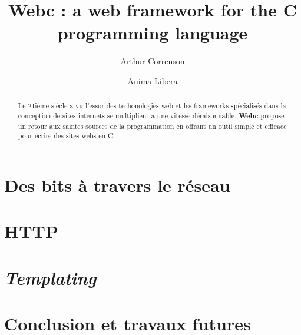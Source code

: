 \documentclass[french, twocolumn]{article}
\begin{document}
    \title{Webc : a web framework for the C programming language}
    \author{Arthur Correnson \and Anima Libera}
    \maketitle
    \begin{abstract}
        Le 21ième siècle a vu l'essor des techonologies web et les frameworks spécialisés dans la conception de sites internets se multiplient a une vitesse déraisonnable. \textbf{Webc} propose un retour aux saintes sources de la programmation en offrant un outil simple et efficace pour écrire des sites webs en C.
    \end{abstract}
    \section{Des bits à travers le réseau}
    \section{HTTP}
    \section{\textit{Templating}}
    \section{Conclusion et travaux futures}
\end{document}
